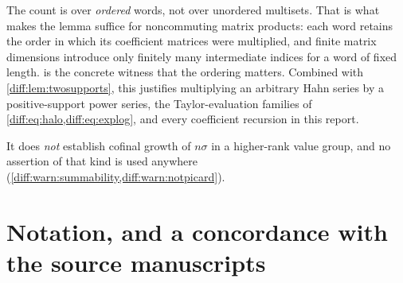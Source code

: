 \documentclass[11pt,letterpaper]{article}
\numberwithin{equation}{section}
\theoremstyle{definition}
\theoremstyle{remark}
\begin{document}
\begin{remark}
\label{diff:rem:orderedwords}
The count is over \emph{ordered} words, not over unordered multisets. That is
what makes the lemma suffice for noncommuting matrix products: each word
retains the order in which its coefficient matrices were multiplied, and
finite matrix dimensions introduce only finitely many intermediate indices for
a word of fixed length.  is the concrete witness that
the ordering matters. Combined with
\cref{diff:lem:twosupports}, this justifies multiplying an arbitrary Hahn
series by a positive-support power series, the Taylor-evaluation families of
\cref{diff:eq:halo,diff:eq:explog}, and every coefficient recursion in this
report.

It does \emph{not} establish cofinal growth of $n\sigma$ in a higher-rank
value group, and no assertion of that kind is used anywhere
(\cref{diff:warn:summability,diff:warn:notpicard}).
\end{remark}

\section{Notation, and a concordance with the source manuscripts}
\label{diff:app:notation}
\end{document}
